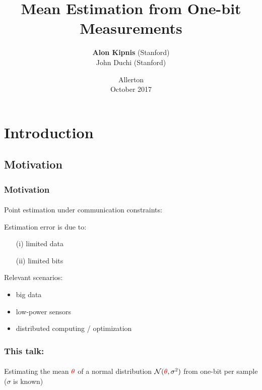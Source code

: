 \documentclass[mathserif]{beamer}
\title{Mean Estimation from One-bit Measurements}
\author{
\textbf{Alon Kipnis} (Stanford) \\
John Duchi (Stanford)\\ 
}
\date[Allerton 2017]{Allerton \\ October 2017}
\newcommand{\thetac}{{\color{red} \theta}}
\begin{document}
\graphicspath{{../Figs/}}

\frame[plain]{\titlepage}


\section{Introduction}


\subsection{Motivation}
\begin{frame}
\frametitle{Motivation}
\framesubtitle{}
Point estimation under communication constraints:\\
\begin{center}
\end{center}
\pause
Estimation error is due to:
\begin{itemize}
\item[(i)] limited data 
\item[(ii)] limited bits
\end{itemize}
\bigskip
\pause
Relevant scenarios:
\begin{itemize}
\pause
\item big data
\pause
\item low-power sensors 
\pause
\item distributed computing / optimization %

\end{itemize}

\end{frame}

\begin{frame}
\frametitle{This talk: }
\framesubtitle{}
Estimating the mean $\thetac$ of a normal distribution $\mathcal N(\thetac,\sigma^2)$ from one-bit per sample ($\sigma$ is known)
\bigskip

\end{frame}
%
\end{document}
